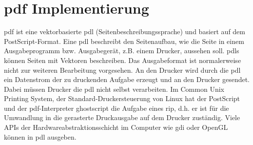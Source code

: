 \section{\gls{pdf} Implementierung}
\gls{pdf} ist eine vektorbasierte \gls{pdl} (Seitenbeschreibungssprache) und basiert auf dem PostScript-Format. Eine \gls{pdl} beschreibt den Seitenaufbau, wie die Seite in einem Ausgabeprogramm bzw. Ausgabegerät, z.B. einem Drucker, aussehen soll. \gls{pdl}s können Seiten mit Vektoren beschreiben. Das Ausgabeformat ist normalerweise nicht zur weiteren Bearbeitung vorgesehen. An den Drucker wird durch die \gls{pdl} ein Datenstrom der zu druckenden Aufgabe erzeugt und an den Drucker gesendet. Dabei müssen Drucker die \gls{pdl} nicht selbst verarbeiten. Im Common Unix Printing System, der Standard-Druckersteuerung von Linux hat der PostScript und der \gls{pdf}-Interpreter ghostscript die Aufgabe eines \gls{rip}, d.h. er ist für die Umwandlung in die gerasterte Druckausgabe auf dem Drucker zuständig. Viele APIs der Hardwareabstraktionsschicht im Computer wie \gls{gdi} oder OpenGL können in \gls{pdl} ausgeben.
